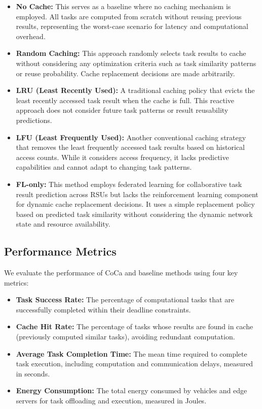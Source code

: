 \begin{itemize}
    \item \textbf{No Cache:} This serves as a baseline where no caching mechanism is employed. All tasks are computed from scratch without reusing previous results, representing the worst-case scenario for latency and computational overhead.
    
    \item \textbf{Random Caching:} This approach randomly selects task results to cache without considering any optimization criteria such as task similarity patterns or reuse probability. Cache replacement decisions are made arbitrarily.
    
    \item \textbf{LRU (Least Recently Used):} A traditional caching policy that evicts the least recently accessed task result when the cache is full. This reactive approach does not consider future task patterns or result reusability predictions.
    
    \item \textbf{LFU (Least Frequently Used):} Another conventional caching strategy that removes the least frequently accessed task results based on historical access counts. While it considers access frequency, it lacks predictive capabilities and cannot adapt to changing task patterns.
    
    \item \textbf{FL-only:} This method employs federated learning for collaborative task result prediction across RSUs but lacks the reinforcement learning component for dynamic cache replacement decisions. It uses a simple replacement policy based on predicted task similarity without considering the dynamic network state and resource availability.
\end{itemize}

\subsection{Performance Metrics}
We evaluate the performance of CoCa and baseline methods using four key metrics:

\begin{itemize}
    \item \textbf{Task Success Rate:} The percentage of computational tasks that are successfully completed within their deadline constraints.
    \item \textbf{Cache Hit Rate:} The percentage of tasks whose results are found in cache (previously computed similar tasks), avoiding redundant computation.
    \item \textbf{Average Task Completion Time:} The mean time required to complete task execution, including computation and communication delays, measured in seconds.
    \item \textbf{Energy Consumption:} The total energy consumed by vehicles and edge servers for task offloading and execution, measured in Joules.
\end{itemize}

